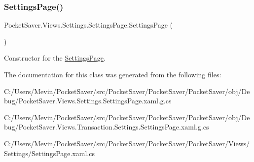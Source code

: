 \subsubsection{\texorpdfstring{Settings\+Page()}{SettingsPage()}}
{\footnotesize\ttfamily Pocket\+Saver.\+Views.\+Settings.\+Settings\+Page.\+Settings\+Page (\begin{DoxyParamCaption}{ }\end{DoxyParamCaption})\hspace{0.3cm}{\ttfamily [inline]}}



Constructor for the \hyperlink{class_pocket_saver_1_1_views_1_1_settings_1_1_settings_page}{Settings\+Page}. 



The documentation for this class was generated from the following files\+:\begin{DoxyCompactItemize}
\item 
C\+:/\+Users/\+Mevin/\+Pocket\+Saver/src/\+Pocket\+Saver/\+Pocket\+Saver/\+Pocket\+Saver/obj/\+Debug/Pocket\+Saver.\+Views.\+Settings.\+Settings\+Page.\+xaml.\+g.\+cs\item 
C\+:/\+Users/\+Mevin/\+Pocket\+Saver/src/\+Pocket\+Saver/\+Pocket\+Saver/\+Pocket\+Saver/obj/\+Debug/Pocket\+Saver.\+Views.\+Transaction.\+Settings.\+Settings\+Page.\+xaml.\+g.\+cs\item 
C\+:/\+Users/\+Mevin/\+Pocket\+Saver/src/\+Pocket\+Saver/\+Pocket\+Saver/\+Pocket\+Saver/\+Views/\+Settings/Settings\+Page.\+xaml.\+cs\end{DoxyCompactItemize}
